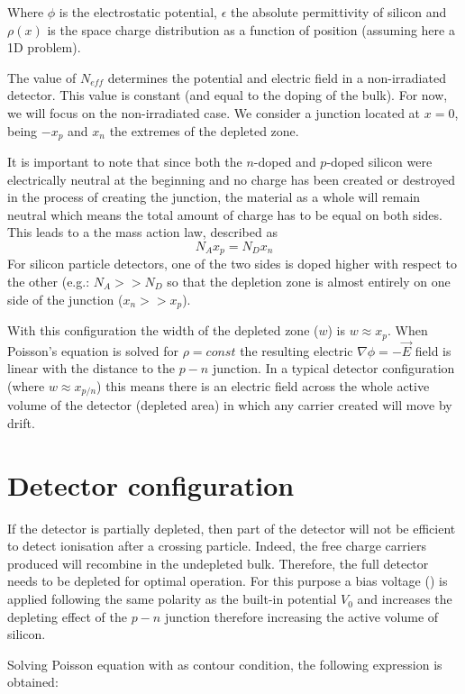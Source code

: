 Where $\phi$ is the electrostatic potential, $\epsilon$ the absolute
permittivity of silicon and $\rho(x)$ is the space charge distribution as a
function of position (assuming here a 1D problem).

The value of $N_{eff}$ determines the potential and electric field in a
non-irradiated detector. This value is constant (and equal to the doping of the
bulk). For now, we will focus on the non-irradiated case. We consider a junction
located at $x=0$, being $-x_p$ and $x_n$ the extremes of the depleted zone.

It is important to note that since both the $n$-doped and $p$-doped silicon were
electrically neutral at the beginning and no charge has been created or
destroyed in the process of creating the junction, the material as a whole will
remain neutral which means the total amount of charge has to be equal on both
sides. This leads to a the mass action law, described as \[N_A x_p = N_D x_n\] 
For silicon particle detectors, one of the two sides is doped higher with
respect to the other (e.g.: $N_A >> N_D$  so that the depletion zone is almost
entirely on one side of the junction ($x_n >> x_p$). 

With this configuration the width of the depleted zone ($w$) is $w \approx x_p$.
When Poisson's equation is solved for $\rho = const$ the resulting electric
$\nabla \phi = -\vec{E}$ field is linear with the distance to the $p-n$
junction. In a typical detector configuration (where $w \approx x_{p/n}$) this
means there is an electric field across the whole active volume of the detector
(depleted area) in which any carrier created will move by drift. 


\section{Detector configuration}

If the detector is partially depleted, then part of the detector will not be
efficient to detect ionisation after a crossing particle. Indeed, the free
charge carriers produced will recombine in the undepleted bulk. Therefore, the
full detector needs to be depleted for optimal operation. For this purpose a
bias voltage (\vias) is applied following the same polarity as the built-in
potential $V_0$ and increases the depleting effect of the $p-n$ junction
therefore increasing the active volume of silicon. 

Solving Poisson equation with \vias as contour condition, the following
expression is obtained: 

